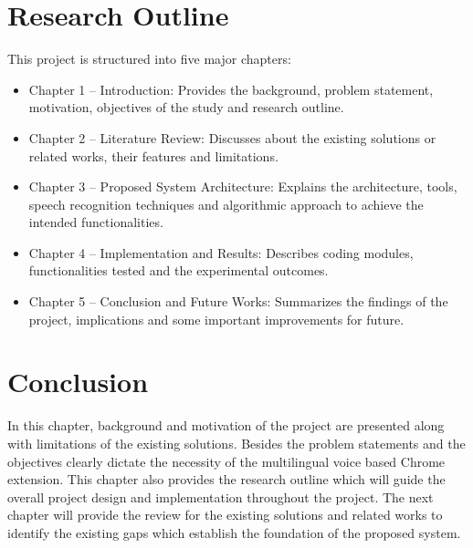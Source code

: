 	\section{Research Outline}
	This project is structured into five major chapters:
	\begin{itemize}
		\item	Chapter 1 – Introduction: Provides the background, problem statement, motivation, objectives of the study and research outline.
		\item	Chapter 2 – Literature Review: Discusses about the existing solutions or related works, their features and limitations.
		\item	Chapter 3 – Proposed System Architecture: Explains the architecture, tools, speech recognition techniques and algorithmic approach to achieve the intended functionalities.
		\item	Chapter 4 – Implementation and Results: Describes coding modules, functionalities tested and the experimental outcomes.
		\item	Chapter 5 – Conclusion and Future Works: Summarizes the findings of the project, implications and some important improvements for future.
	\end{itemize}
	
	\section{Conclusion}
	In this chapter, background and motivation of the project are presented along with limitations of the existing solutions. Besides the problem statements and the objectives clearly dictate the necessity of the multilingual voice based Chrome extension. This chapter also provides the research outline which will guide the overall project design and implementation throughout the project. The next chapter will provide the review for the existing solutions and related works to identify the existing gaps which establish the foundation of the proposed system.
	

